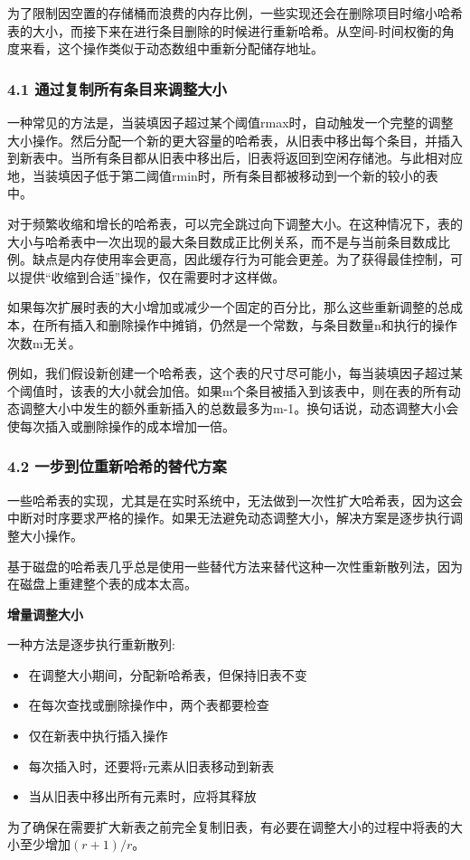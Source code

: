 为了限制因空置的存储桶而浪费的内存比例，一些实现还会在删除项目时缩小哈希表的大小，而接下来在进行条目删除的时候进行重新哈希。从空间-时间权衡的角度来看，这个操作类似于动态数组中重新分配储存地址。

\subsubsection{4.1 通过复制所有条目来调整大小}
一种常见的方法是，当装填因子超过某个阈值rmax时，自动触发一个完整的调整大小操作。然后分配一个新的更大容量的哈希表，从旧表中移出每个条目，并插入到新表中。当所有条目都从旧表中移出后，旧表将返回到空闲存储池。与此相对应地，当装填因子低于第二阈值rmin时，所有条目都被移动到一个新的较小的表中。

对于频繁收缩和增长的哈希表，可以完全跳过向下调整大小。在这种情况下，表的大小与哈希表中一次出现的最大条目数成正比例关系，而不是与当前条目数成比例。缺点是内存使用率会更高，因此缓存行为可能会更差。为了获得最佳控制，可以提供“收缩到合适”操作，仅在需要时才这样做。

如果每次扩展时表的大小增加或减少一个固定的百分比，那么这些重新调整的总成本，在所有插入和删除操作中摊销，仍然是一个常数，与条目数量n和执行的操作次数m无关。

例如，我们假设新创建一个哈希表，这个表的尺寸尽可能小，每当装填因子超过某个阈值时，该表的大小就会加倍。如果m个条目被插入到该表中，则在表的所有动态调整大小中发生的额外重新插入的总数最多为m-1。换句话说，动态调整大小会使每次插入或删除操作的成本增加一倍。

\subsubsection{4.2 一步到位重新哈希的替代方案}
一些哈希表的实现，尤其是在实时系统中，无法做到一次性扩大哈希表，因为这会中断对时序要求严格的操作。如果无法避免动态调整大小，解决方案是逐步执行调整大小操作。

基于磁盘的哈希表几乎总是使用一些替代方法来替代这种一次性重新散列法，因为在磁盘上重建整个表的成本太高。

\textbf{增量调整大小}

一种方法是逐步执行重新散列:
\begin{itemize}
\item 在调整大小期间，分配新哈希表，但保持旧表不变
\item 在每次查找或删除操作中，两个表都要检查
\item 仅在新表中执行插入操作
\item 每次插入时，还要将r元素从旧表移动到新表
\item 当从旧表中移出所有元素时，应将其释放
\end{itemize}
为了确保在需要扩大新表之前完全复制旧表，有必要在调整大小的过程中将表的大小至少增加$(r + 1)/r$。

